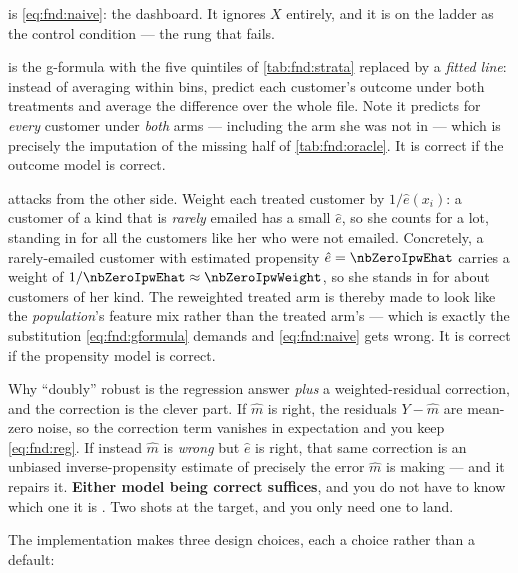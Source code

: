  is \cref{eq:fnd:naive}: the dashboard. It ignores $X$ entirely, and it
is on the ladder as the control condition --- the rung that fails.

 is the g-formula with the five quintiles of \cref{tab:fnd:strata} replaced by
a \emph{fitted line}: instead of averaging within bins, predict each customer's outcome under
both treatments and average the difference over the whole file. Note it predicts for
\emph{every} customer under \emph{both} arms --- including the arm she was not in --- which is
precisely the imputation of the missing half of \cref{tab:fnd:oracle}. It is correct if the
outcome model is correct.

 attacks from the other side. Weight each treated customer by
$1/\hat e(x_i)$: a customer of a kind that is \emph{rarely} emailed has a small $\hat e$, so
she counts for a lot, standing in for all the customers like her who were not emailed.
Concretely, a rarely-emailed customer with estimated propensity $\hat e = \nbZeroIpwEhat$ carries
a weight of $1/\nbZeroIpwEhat \approx \nbZeroIpwWeight$, so she stands in for about
\nbZeroIpwWeight{} customers of her kind. The reweighted treated arm is thereby made to look like
the \emph{population}'s feature mix rather
than the treated arm's \citep{rosenbaum1983} --- which is exactly the substitution
\cref{eq:fnd:gformula} demands and \cref{eq:fnd:naive} gets wrong. It is correct if the
propensity model is correct.

\begin{intuition}{Why ``doubly'' robust}
 is the regression answer \emph{plus} a weighted-residual correction, and the
correction is the clever part. If $\hat m$ is right, the residuals $Y - \hat m$ are mean-zero
noise, so the correction term vanishes in expectation and you keep \cref{eq:fnd:reg}. If
instead $\hat m$ is \emph{wrong} but $\hat e$ is right, that same correction is an unbiased
inverse-propensity estimate of precisely the error $\hat m$ is making --- and it repairs it.
\textbf{Either model being correct suffices}, and you do not have to know which one it is
\citep{robins1994}. Two shots at the target, and you only need one to land.
\end{intuition}

The implementation makes three design choices, each a choice rather than a default:

